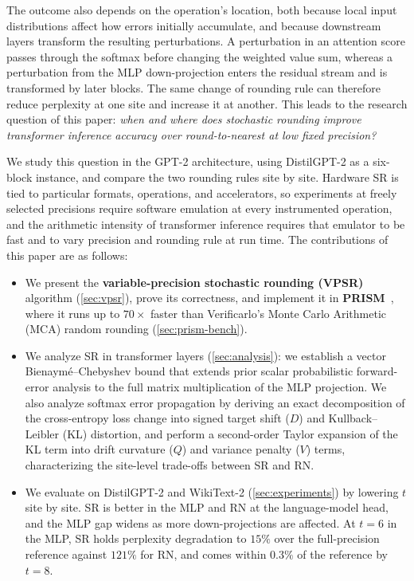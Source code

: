 The outcome also depends on the operation's location, both because local input
distributions affect how errors initially accumulate, and because downstream
layers transform the resulting perturbations. A perturbation in an attention score
passes through the softmax before changing the weighted value sum, whereas a
perturbation from the MLP down-projection enters the residual stream and is
transformed by later blocks. The same change of rounding rule can therefore
reduce perplexity at one site and increase it at another. This leads to the
research question of this paper: \emph{when and where does stochastic rounding
      improve transformer inference accuracy over round-to-nearest at low fixed
      precision?}

We study this question in the GPT-2 architecture, using DistilGPT-2 as a
six-block instance, and compare the two rounding rules site by site. Hardware
SR is tied to particular formats, operations, and accelerators, so experiments
at freely selected precisions require software emulation at every instrumented
operation, and the arithmetic intensity of transformer inference requires that
emulator to be fast and to vary precision and rounding rule at run time. The
contributions of this paper are as follows:

\begin{itemize}[leftmargin=1.5em]
      \item We present the \textbf{variable-precision stochastic rounding
                  (VPSR)} algorithm (\cref{sec:vpsr}), prove its correctness, and
            implement it in \textbf{PRISM}~\citep{prism}, where it runs up to
            $70\times$ faster than Verificarlo's Monte Carlo Arithmetic (MCA)
            random rounding (\cref{sec:prism-bench}).
      \item We analyze SR in transformer layers (\cref{sec:analysis}): we establish a
            vector Bienaym\'e--Chebyshev bound that extends prior scalar
            probabilistic forward-error analysis to the full matrix multiplication
            of the MLP projection. We also analyze softmax error propagation by
            deriving an exact decomposition of the cross-entropy loss change
            into signed target shift ($D$) and Kullback--Leibler (KL) distortion, and perform
            a second-order Taylor expansion of the KL term into drift curvature
            ($Q$) and variance penalty ($V$) terms, characterizing the
            site-level trade-offs between SR and RN.
      \item We evaluate on DistilGPT-2 and WikiText-2 (\cref{sec:experiments})
            by lowering $t$ site by site. SR is better in the MLP and RN at the
            language-model head, and the MLP gap widens as more down-projections
            are affected. At $t=6$ in the MLP, SR holds perplexity degradation to
            $15\%$ over the full-precision reference against $121\%$ for RN, and
            comes within $0.3\%$ of the reference by $t=8$.
\end{itemize}

